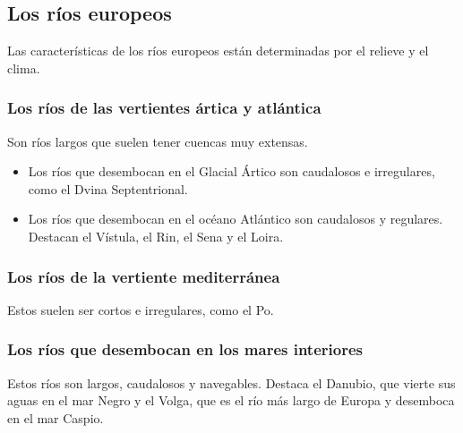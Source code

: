 \subsection{Los ríos europeos}

Las características de los ríos europeos están determinadas por el relieve y el clima.

\subsubsection{Los ríos de las vertientes ártica y atlántica}

Son ríos largos que suelen tener cuencas muy extensas.

\begin{itemize}
    \item Los ríos que desembocan en el Glacial Ártico son caudalosos e irregulares, como el Dvina Septentrional.
    \item Los ríos que desembocan en el océano Atlántico son caudalosos y regulares. Destacan el Vístula, el Rin, el Sena y el Loira.
\end{itemize}

\subsubsection{Los ríos de la vertiente mediterránea}

Estos suelen ser cortos e irregulares, como el Po.

\subsubsection{Los ríos que desembocan en los mares interiores}

Estos ríos son largos, caudalosos y navegables. Destaca el Danubio, que vierte sus aguas en el mar Negro y el Volga, que es el río más largo de Europa y desemboca en el mar Caspio.